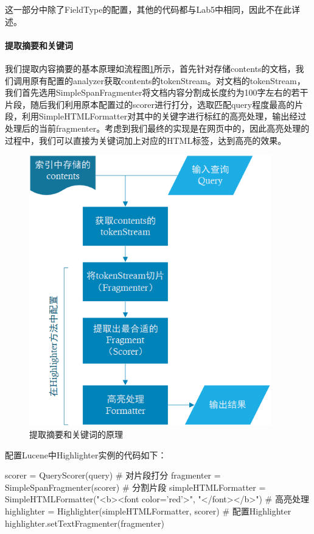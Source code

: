 \documentclass{article}
\begin{document}
这一部分中除了FieldType的配置，其他的代码都与Lab5中相同，因此不在此详述。


\paragraph{提取摘要和关键词}

我们提取内容摘要的基本原理如流程图\ref{fig:flowchart}所示，首先针对存储contents的文档，我们调用原有配置的analyzer获取contents的tokenStream。对文档的tokenStream，我们首先选用SimpleSpanFragmenter将文档内容分割成长度约为100字左右的若干片段，随后我们利用原本配置过的scorer进行打分，选取匹配query程度最高的片段，利用SimpleHTMLFormatter对其中的关键字进行标红的高亮处理，输出经过处理后的当前fragmenter。考虑到我们最终的实现是在网页中的，因此高亮处理的过程中，我们可以直接为关键词加上对应的HTML标签，达到高亮的效果。

\begin{figure}[htbp]
\centering
\includegraphics[width=10.5cm]{img/flowchart.png}
\caption{提取摘要和关键词的原理}
\label{fig:flowchart}
\end{figure}


配置Lucene中Highlighter实例的代码如下：
\begin{python}
scorer = QueryScorer(query)                                   # 对片段打分
fragmenter = SimpleSpanFragmenter(scorer)                     # 分割片段
simpleHTMLFormatter = SimpleHTMLFormatter("<b><font color='red'>", "</font></b>")
                                                              # 高亮处理
highlighter = Highlighter(simpleHTMLFormatter, scorer)        # 配置Highlighter
highlighter.setTextFragmenter(fragmenter)
\end{python}
\end{document}
